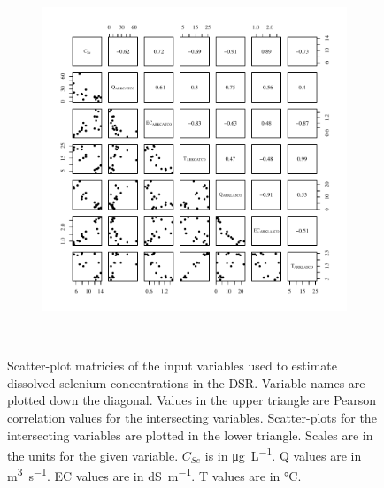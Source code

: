 \begin{landscape}
\begin{figure}
\begin{subfigure}{0.7\textwidth}
			\includegraphics[width=\tableCustomSize]{"Figures/Results_USR/Stochastic/Conc Model Full PairsU201"}
		\end{subfigure}\\
		\caption[Scatter-plot matricies of the input variables used to estimate dissolved selenium concentrations in the DSR.]{Scatter-plot matricies of the input variables used to estimate dissolved selenium concentrations in the DSR.  Variable names are plotted down the diagonal.  Values in the upper triangle are Pearson correlation values for the intersecting variables.  Scatter-plots for the intersecting variables are plotted in the lower triangle.  Scales are in the units for the given variable.  $C_{Se}$ is in \si{\micro\gram\per\liter}.  Q values are in \si{\cubic\meter\per\second}.  EC values are in \si{\deci\siemens\per\meter}.  T values are in \si{\degreeCelsius}.}
		\label{fig:concFullPairs_DS}
	\end{figure}
\end{landscape}
\subfiguremid
